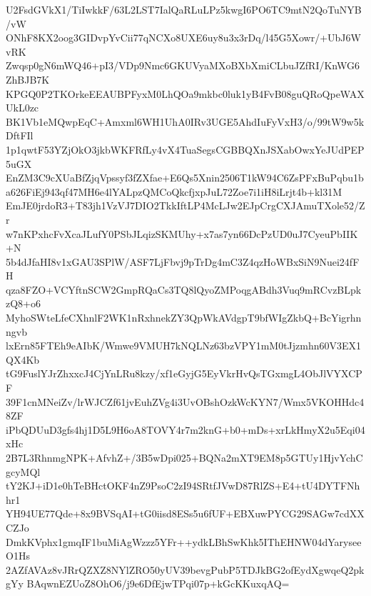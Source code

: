 U2FsdGVkX1/TiIwkkF/63L2LST7IalQaRLuLPz5kwgI6PO6TC9mtN2QoTuNYB/vW
ONhF8KX2oog3GIDvpYvCii77qNCXo8UXE6uy8u3x3rDq/l45G5Xowr/+UbJ6WvRK
Zwqsp0gN6mWQ46+pI3/VDp9Nmc6GKUVyaMXoBXbXmiCLbuJZfRI/KnWG6ZhBJB7K
KPGQ0P2TKOrkeEEAUBPFyxM0LhQOa9mkbc0luk1yB4FvB08guQRoQpeWAXUkL0zc
BK1Vb1eMQwpEqC+Amxml6WH1UhA0IRv3UGE5AhdIuFyVxH3/o/99tW9w5kDftFIl
1p1qwtF53YZjOkO3jkbWKFRfLy4vX4TuaSegsCGBBQXnJSXabOwxYeJUdPEP5uGX
EnZM3C9cXUaBfZjqVpssyf3fZXfae+E6Qs5Xnin2506T1kW94C6ZsPFxBuPqbu1b
a626FiEj943qf47MH6e4lYALpzQMCoQkcfjxpJuL72Zoe7i1iH8iLrjt4b+kl31M
EmJE0jrdoR3+T83jh1VzVJ7DIO2TkkIftLP4McLJw2EJpCrgCXJAmuTXole52/Zr
w7nKPxhcFvXcaJLufY0PSbJLqizSKMUhy+x7as7yn66DcPzUD0uJ7CyeuPbIIK+N
5b4dJfaHI8v1xGAU3SPlW/ASF7LjFbvj9pTrDg4mC3Z4qzHoWBxSiN9Nuei24fFH
qza8FZO+VCYftnSCW2GmpRQaCs3TQ8lQyoZMPoqgABdh3Vuq9mRCvzBLpkzQ8+o6
MyhoSWteLfeCXhnlF2WK1nRxhnekZY3QpWkAVdgpT9bfWIgZkbQ+BcYigrhnngvb
lxErn85FTEh9eAIbK/Wmwe9VMUH7kNQLNz63bzVPY1mM0tJjzmhn60V3EX1QX4Kb
tG9FuslYJrZhxxcJ4CjYnLRu8kzy/xf1eGyjG5EyVkrHvQsTGxmgL4ObJlVYXCPF
39F1cnMNeiZv/lrWJCZf61jvEuhZVg4i3UvOBshOzkWcKYN7/Wmx5VKOHHdc48ZF
iPbQDUuD3gfs4hj1D5L9H6oA8TOVY4r7m2knG+b0+mDs+xrLkHmyX2u5Eqi04xHc
2B7L3RhnmgNPK+AfvhZ+/3B5wDpi025+BQNa2mXT9EM8p5GTUy1HjvYchCgcyMQl
tY2KJ+iD1e0hTeBHctOKF4nZ9PsoC2zI94SRtfJVwD87RlZS+E4+tU4DYTFNhhr1
YH94UE77Qde+8x9BVSqAI+tG0iisd8ESs5u6fUF+EBXuwPYCG29SAGw7cdXXCZJo
DmkKVphx1gmqIF1buMiAgWzzz5YFr++ydkLBhSwKhk5IThEHNW04dYaryseeO1Hs
2AZfAVAz8vJRrQZXZ8NYlZRO50yUV39bevgPubP5TDJkBG2ofEydXgwqeQ2pkgYy
BAqwnEZUoZ8OhO6/j9e6DfEjwTPqi07p+kGcKKuxqAQ=
